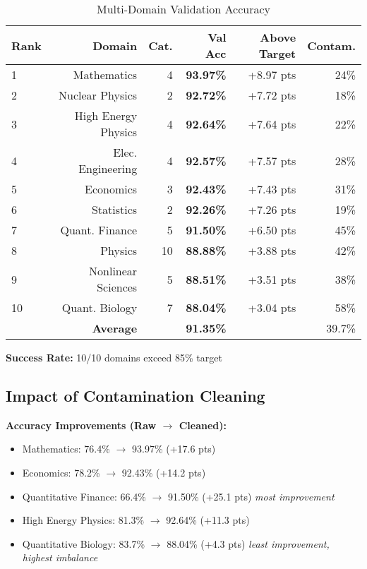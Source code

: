 \documentclass{article}
\begin{document}
\begin{table}[h]
\centering
\caption{Multi-Domain Validation Accuracy}
\label{tab:results}
\small
\begin{tabular}{lrrrrr}
\toprule
\textbf{Rank} & \textbf{Domain} & \textbf{Cat.} & \textbf{Val Acc} & \textbf{Above Target} & \textbf{Contam.} \\
\midrule
1 & Mathematics & 4 & \textbf{93.97\%} & +8.97 pts & 24\% \\
2 & Nuclear Physics & 2 & \textbf{92.72\%} & +7.72 pts & 18\% \\
3 & High Energy Physics & 4 & \textbf{92.64\%} & +7.64 pts & 22\% \\
4 & Elec. Engineering & 4 & \textbf{92.57\%} & +7.57 pts & 28\% \\
5 & Economics & 3 & \textbf{92.43\%} & +7.43 pts & 31\% \\
6 & Statistics & 2 & \textbf{92.26\%} & +7.26 pts & 19\% \\
7 & Quant. Finance & 5 & \textbf{91.50\%} & +6.50 pts & 45\% \\
8 & Physics & 10 & \textbf{88.88\%} & +3.88 pts & 42\% \\
9 & Nonlinear Sciences & 5 & \textbf{88.51\%} & +3.51 pts & 38\% \\
10 & Quant. Biology & 7 & \textbf{88.04\%} & +3.04 pts & 58\% \\
\midrule
& \textbf{Average} & & \textbf{91.35\%} & & 39.7\% \\
\bottomrule
\end{tabular}
\end{table}

\textbf{Success Rate:} 10/10 domains exceed 85\% target

\subsection{Impact of Contamination Cleaning}

\textbf{Accuracy Improvements (Raw $\rightarrow$ Cleaned):}
\begin{itemize}
    \item Mathematics: 76.4\% $\rightarrow$ 93.97\% (+17.6 pts)
    \item Economics: 78.2\% $\rightarrow$ 92.43\% (+14.2 pts)
    \item Quantitative Finance: 66.4\% $\rightarrow$ 91.50\% (+25.1 pts) \emph{most improvement}
    \item High Energy Physics: 81.3\% $\rightarrow$ 92.64\% (+11.3 pts)
    \item Quantitative Biology: 83.7\% $\rightarrow$ 88.04\% (+4.3 pts) \emph{least improvement, highest imbalance}
\end{itemize}
\end{document}

